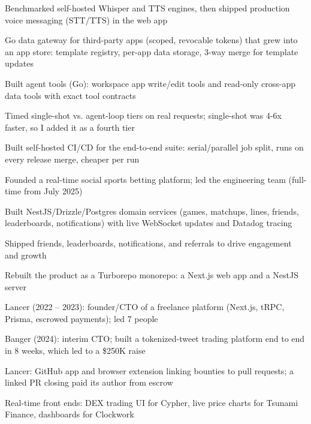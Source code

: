 \documentclass[print]{jack-resume}
\begin{document}
\begin{tightemize}
    \item Benchmarked self-hosted Whisper and TTS engines, then shipped production voice messaging (STT/TTS) in the web app
    \item Go data gateway for third-party apps (scoped, revocable tokens) that grew into an app store: template registry, per-app data storage, 3-way merge for template updates
    \item Built agent tools (Go): workspace app write/edit tools and read-only cross-app data tools with exact tool contracts
    \item Timed single-shot vs. agent-loop tiers on real requests; single-shot was 4-6x faster, so I added it as a fourth tier
    \item Built self-hosted CI/CD for the end-to-end suite: serial/parallel job split, runs on every release merge, cheaper per run
\end{tightemize}
\sectionsep

\begin{tightemize}
    \item Founded a real-time social sports betting platform; led the engineering team (full-time from July 2025)
    \item Built NestJS/Drizzle/Postgres domain services (games, matchups, lines, friends, leaderboards, notifications) with live WebSocket updates and Datadog tracing
    \item Shipped friends, leaderboards, notifications, and referrals to drive engagement and growth
    \item Rebuilt the product as a Turborepo monorepo: a Next.js web app and a NestJS server
\end{tightemize}
\sectionsep

\begin{tightemize}
    \item Lancer (2022 -- 2023): founder/CTO of a freelance platform (Next.js, tRPC, Prisma, escrowed payments); led 7 people
    \item Banger (2024): interim CTO; built a tokenized-tweet trading platform end to end in 8 weeks, which led to a \$250K raise
    \item Lancer: GitHub app and browser extension linking bounties to pull requests; a linked PR closing paid its author from escrow
    \item Real-time front ends: DEX trading UI for Cypher, live price charts for Tsunami Finance, dashboards for Clockwork
\end{tightemize}
\sectionsep
\end{document}
